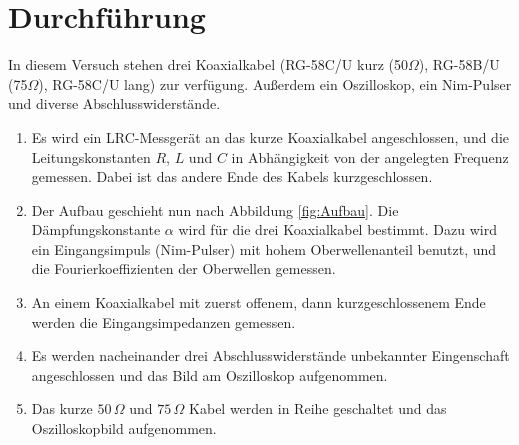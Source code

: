 

\section{Durchführung}
In diesem Versuch stehen drei Koaxialkabel (RG-58C/U kurz (50$\Omega$), RG-58B/U (75$ \Omega$), RG-58C/U lang) 
zur 
verfügung. Außerdem ein Oszilloskop, ein Nim-Pulser und diverse 
Abschlusswiderstände.

\begin{enumerate}
\item 	Es wird ein LRC-Messgerät an das kurze Koaxialkabel angeschlossen, und die 
		Leitungskonstanten $R$, $L$ und $C$ in Abhängigkeit von der angelegten 
		Frequenz gemessen. Dabei ist das andere Ende des Kabels kurzgeschlossen.

\item 	Der Aufbau geschieht nun nach Abbildung \ref{fig:Aufbau}. 
		Die Dämpfungskonstante $\alpha$ wird für die drei Koaxialkabel bestimmt. 
		Dazu wird ein Eingangsimpuls (Nim-Pulser) mit hohem Oberwellenanteil  
		benutzt, und die 
		Fourierkoeffizienten der Oberwellen gemessen.
		
\item 	An einem Koaxialkabel mit zuerst offenem, dann kurzgeschlossenem Ende 
		werden die Eingangsimpedanzen gemessen.	
		
\item	Es werden 
		nacheinander drei Abschlusswiderstände unbekannter Eingenschaft 
		angeschlossen und das Bild am Oszilloskop aufgenommen.

\item	Das kurze $50 \,\Omega$ und $75 \, \Omega$ Kabel werden in Reihe geschaltet und 
		das	Oszilloskopbild aufgenommen.
		
		
\end{enumerate}

